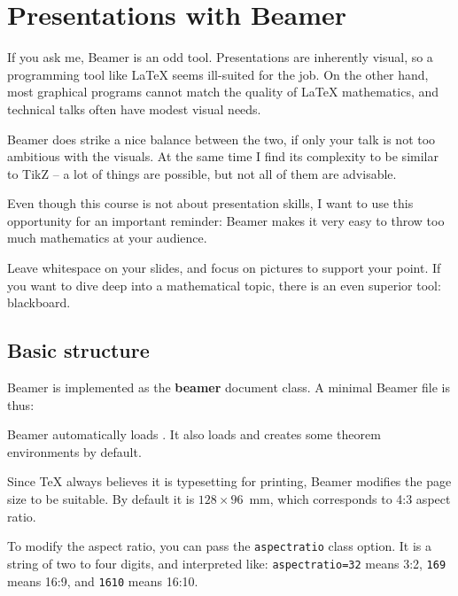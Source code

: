 \chapter{Presentations with Beamer}

If you ask me, Beamer is an odd tool.
Presentations are inherently visual,
so a programming tool like \LaTeX{} seems ill-suited for the job.
On the other hand, most graphical programs cannot match the quality of \LaTeX{} mathematics,
and technical talks often have modest visual needs.

Beamer does strike a nice balance between the two,
if only your talk is not too ambitious with the visuals.
At the same time I find its complexity to be similar to TikZ
-- a lot of things are possible, but not all of them are advisable.

\begin{practices}
Even though this course is not about presentation skills,
I want to use this opportunity for an important reminder:
Beamer makes it very easy to throw too much mathematics at your audience.

Leave whitespace on your slides, and focus on pictures to support your point.
If you want to dive deep into a mathematical topic,
there is an even superior tool: blackboard.
\end{practices}


%
%
\section{Basic structure}

Beamer is implemented as the \textbf{beamer} document class.
A minimal Beamer file is thus:
%
%
Beamer automatically loads .
It also loads  and creates some theorem environments by default.

Since \TeX{} always believes it is typesetting for printing,
Beamer modifies the page size to be suitable.
By default it is $128 $~mm, which corresponds to 4:3 aspect ratio.

To modify the aspect ratio, you can pass the \verb|aspectratio| class option.
It is a string of two to four digits, and interpreted like:
\verb|aspectratio=32| means 3:2, \verb|169| means 16:9, and \verb|1610| means 16:10.

